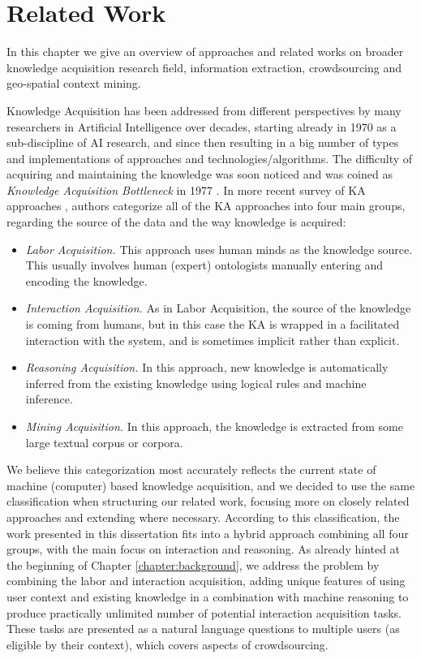 \chapter{Related Work}
\label{chapter:related}
In this chapter we give an overview of approaches and related works on
broader knowledge acquisition research field, information extraction, 
crowdsourcing and geo-spatial context mining. 

Knowledge Acquisition has been addressed from different perspectives by many 
researchers in Artificial Intelligence over decades, starting already in 1970 
as a sub-discipline of AI research, and since then resulting in a big number of 
types and implementations of approaches and technologies/algorithms. The 
difficulty of acquiring and maintaining the knowledge was soon noticed and was 
coined as \emph{Knowledge Acquisition Bottleneck} in 
1977 \parencite{Feigenbaum1977}. In more recent survey of KA approaches 
\parencite{Zang2013}, authors categorize all of the KA approaches into four main
groups, regarding the source of the data and the way knowledge is acquired:
\begin{itemize}
	\item \emph{Labor Acquisition.} This approach uses human minds as the 
    knowledge source. This usually involves human (expert) ontologists manually 
    entering and encoding the knowledge.
	\item \emph{Interaction Acquisition.} As in Labor Acquisition, the source 
    of the knowledge is coming from humans, but in this case the KA is wrapped 
    in a facilitated interaction with the system, and is sometimes implicit 
    rather than explicit.
	\item \emph{Reasoning Acquisition.} In this approach, new knowledge is 
    automatically inferred from the existing knowledge using logical rules and 
    machine inference.
	\item \emph{Mining Acquisition.} In this approach, the knowledge is 
    extracted from some large textual corpus or corpora.
\end{itemize}

We believe this categorization most accurately reflects the current state of 
machine (computer) based knowledge acquisition, and we decided to use the same 
classification when structuring our related work, focusing more on closely 
related approaches and extending where necessary. According to this 
classification, the work presented in this dissertation fits into a hybrid 
approach combining all four groups, with the main focus on interaction and 
reasoning. As already hinted at the beginning of Chapter \ref{chapter:background},
we address the problem by combining the labor and interaction acquisition, 
adding unique features of using user context and existing knowledge in a 
combination with machine reasoning to produce practically unlimited number of 
potential interaction acquisition tasks. These tasks are presented as a 
natural language questions to multiple users (as eligible by their context),
which covers aspects of crowdsourcing. 

